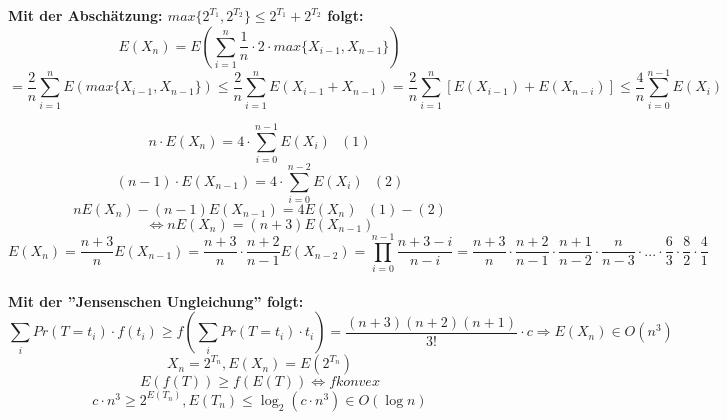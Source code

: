 \textbf{Mit der Abschätzung: $max\{2^{T_1}, 2^{T_2}\} \leq 2^{T_1} + 2^{T_2}$ folgt:}
\[E(X_n) = E(\sum^n_{i=1} \frac{1}{n} \cdot  2 \cdot max\{X_{i-1}, X_{n-1}\}) \]
\[= \frac{2}{n} \sum^n_{i=1} E(max\{X_{i-1}, X_{n-1}\}) \leq \frac{2}{n} \sum^n_{i=1} E(X_{i-1} + X_{n-1}) = \frac{2}{n} \sum^n_{i=1} [E(X_{i-1}) + E(X_{n-i})] \leq \frac{4}{n} \sum^{n-1}_{i=0} E(X_i)\] 

\[ n \cdot E(X_n) = 4 \cdot \sum^{n-1}_{i=0} E(X_i) ~~~(1)\]
\[ (n-1) \cdot E(X_{n-1}) = 4 \cdot \sum^{n-2}_{i=0} E(X_i) ~~~(2)\]
\[ nE(X_n) - (n-1)E(X_{n-1}) = 4E(X_n) ~~~(1)-(2)\]
\[\Leftrightarrow nE(X_n) = (n+3)E(X_{n-1})\]
\[E(X_n)=\frac{n+3}{n}E(X_{n-1})=\frac{n+3}{n} \cdot \frac{n+2}{n-1}E(X_{n-2}) = \prod^{n-1}_{i=0} \frac{n+3-i}{n-i} = \frac{n+3}{n} \cdot \frac{n+2}{n-1} \cdot \frac{n+1}{n-2} \cdot \frac{n}{n-3} \cdot ... \cdot \frac{6}{3} \cdot \frac{8}{2} \cdot \frac{4}{1} \]\\

\textbf{Mit der ''Jensenschen Ungleichung'' folgt:}
\[ \sum_i Pr(T=t_i) \cdot f(t_i) \geq f\left(\sum_i Pr(T=t_i) \cdot t_i\right) = \frac{ (n+3)(n+2)(n+1) } { 3!}  \cdot c \Rightarrow E(X_n) \in O(n^3)\]
\[X_n = 2^{T_n},  E(X_n) = E(2^{T_n}) \]
\[E(f(T)) \geq f(E(T)) \Leftrightarrow f konvex\]
\[c \cdot n^3 \geq 2^{E(T_n)}, E(T_n) \leq \log_2(c \cdot n^3) \in O(\log n) \]

